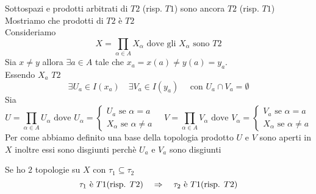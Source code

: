 \spazio
\begin{prop}
Sottospazi e prodotti arbitrati di $T2$ (risp. $T1$) sono ancora $T2$ (risp. $T1$)
\proof Mostriamo che prodotti di $T2$ \`e $T2$\\
Consideriamo  $$X=\prod_{\alpha \in A} X_\alpha  \text{ dove gli } X_\alpha \text{ sono } T2$$
Sia $x\neq y$ allora $\exists a \in A $ tale che $x_a=x(a) \neq y(a)=y_a$.\\
Essendo $X_a$ $T2$ 
$$ \exists U_a \in I(x_a) \quad \exists V_a \in I(y_a) \quad \text{ con } U_a \cap V_a = \emptyset$$
Sia
$$ U= \prod_{\alpha \in A } U_\alpha \text{ dove } U_\alpha = \begin{cases}U_a\text{ se } \alpha=a\\ 
									   X_\alpha \text{ se } \alpha \neq a 
                                                  
                                                              \end{cases}
 \quad 
V= \prod_{\alpha \in A } V_\alpha \text{ dove } V_\alpha = \begin{cases}V_a\text{ se } \alpha=a\\ 
									   X_\alpha \text{ se } \alpha \neq a 
                                                  
                                                              \end{cases}$$
Per come abbiamo definito una base della topologia prodotto $U$ e $V$ sono aperti in $X$ inoltre essi sono disgiunti perch\`e $U_a$ e $V_a$ sono disgiunti

\end{prop}
\begin{oss}
Se ho $2$ topologie su $X$ con $\tau_1 \subseteq \tau_2$
$$ \tau_1 \text{ \`e } T1 \text{(risp. } T2 \text{)} \quad \Rightarrow \quad \tau_2 \text{ \`e } T1 \text{(risp. } T2 \text{)}$$

\end{oss}
\spazio
